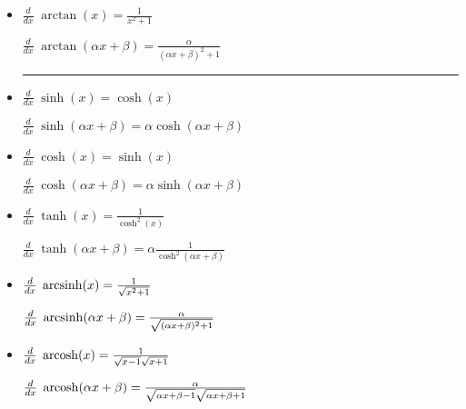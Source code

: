 \begin{itemize}[leftmargin=*]
	\item 
	\begin{minipage}{0.4\columnwidth}
		$\frac{d}{dx}\; \arctan(x) = \frac{1}{x^2+1}$
	\end{minipage}
	\begin{minipage}{0.55\columnwidth}
		$\frac{d}{dx}\; \arctan(\alpha x + \beta) = \frac{\alpha}{(\alpha x + \beta)^2 + 1}$
	\end{minipage}
	\vspace{-0.2cm}
	\hrule
	\item 
	{\small
	\begin{minipage}{0.4\columnwidth}
		$\frac{d}{dx}\; \sinh(x) = \cosh(x)$
	\end{minipage}
	\begin{minipage}{0.55\columnwidth}
		$\frac{d}{dx}\; \sinh(\alpha x + \beta) = \alpha \cosh(\alpha x + \beta)$
	\end{minipage}}

	\item
	{\small
	\begin{minipage}{0.4\columnwidth}
		$\frac{d}{dx}\; \cosh(x) = \sinh(x)$
	\end{minipage}
	\begin{minipage}{0.55\columnwidth}
		$\frac{d}{dx}\; \cosh(\alpha x + \beta) = \alpha \sinh(\alpha x + \beta)$
	\end{minipage}}
	
	\item 
	{\small
	\begin{minipage}{0.4\columnwidth}
		$\frac{d}{dx}\; \tanh(x) = \frac{1}{\cosh^2(x)}$
	\end{minipage}
	\begin{minipage}{0.55\columnwidth}
		$\frac{d}{dx}\; \tanh(\alpha x + \beta) = \alpha \frac{1}{\cosh^2(\alpha x + \beta)}$
	\end{minipage}}

	\item 
	{\small
	\begin{minipage}{0.4\columnwidth}
		$\frac{d}{dx}\; \operatorname{arcsinh}(x) = \frac{1}{\sqrt{x^2 + 1}}$
	\end{minipage}
	\begin{minipage}{0.55\columnwidth}
		$\frac{d}{dx}\; \operatorname{arcsinh}(\alpha x + \beta) = \frac{\alpha}{\sqrt{(\alpha x + \beta)^2 + 1}}$
	\end{minipage}}
	
	\item
	{\footnotesize
	\begin{minipage}{0.4\columnwidth}
		$\frac{d}{dx}\; \operatorname{arcosh}(x) = \frac{1}{\sqrt{x-1} \sqrt{x + 1}}$
	\end{minipage}
	\begin{minipage}{0.55\columnwidth}
		$\frac{d}{dx}\; \operatorname{arcosh}(\alpha x + \beta) = \frac{\alpha}{\sqrt{\alpha x + \beta - 1} \sqrt{\alpha x + \beta + 1}}$
	\end{minipage}}


\end{itemize}
